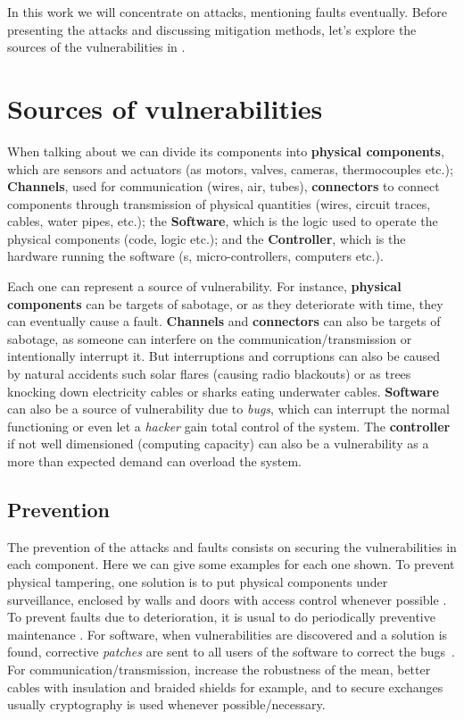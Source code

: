 \documentclass[../main.tex]{subfiles}
\begin{document}
In this work we will concentrate on attacks, mentioning faults eventually.
Before presenting the attacks and discussing mitigation methods, let's explore the sources of the vulnerabilities in \cps{}.

\section{Sources of vulnerabilities}

When talking about \cps{} we can divide its components into \textbf{physical components}, which are sensors and actuators (as motors, valves, cameras, thermocouples etc.);
\textbf{Channels}, used for communication (wires, air, tubes), \textbf{connectors} to connect components through transmission of physical quantities (wires, circuit traces, cables, water pipes, etc.);
the \textbf{Software}, which is the logic used to operate the physical components (code, \plc{} logic etc.); and the \textbf{Controller}, which is the hardware running the software (\plc{}s, micro-controllers, computers etc.).

Each one can represent a source of vulnerability. For instance, \textbf{physical components} can be targets of sabotage, or as they deteriorate with time, they can eventually cause a fault.
\textbf{Channels} and \textbf{connectors} can also be targets of sabotage, as someone can interfere on the communication/transmission or intentionally interrupt it. But interruptions and corruptions can also be caused by natural accidents such solar flares (causing radio blackouts) or as trees knocking down electricity cables or sharks eating underwater cables.
\textbf{Software} can also be a source of vulnerability due to \emph{bugs}, which can interrupt the normal functioning or even let a \emph{hacker} gain total control of the system.
The \textbf{controller} if not well dimensioned (computing capacity) can also be a vulnerability as a more than expected demand can overload the system.

\subsection{Prevention}

The prevention of the attacks and faults consists on securing the vulnerabilities in each component. Here we can give some examples for each one shown.
To prevent physical tampering, one solution is to put physical components under surveillance, enclosed by walls and doors with access control whenever possible .
To prevent faults due to deterioration, it is usual to do periodically preventive maintenance .
For software, when vulnerabilities are discovered and a solution is found, corrective \emph{patches} are sent to all users of the software to correct the bugs~.
For communication/transmission, increase the robustness of the mean, better cables with insulation and braided shields for example, and to secure exchanges usually cryptography is used whenever possible/necessary.


\printbibliography%
\end{document}
